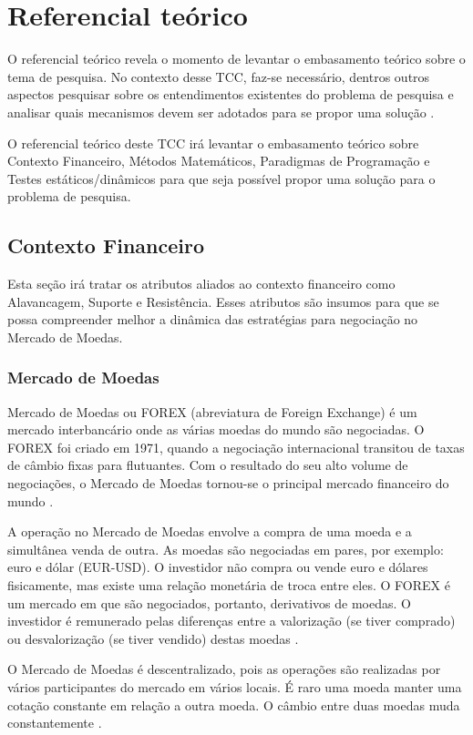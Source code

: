 \chapter{Referencial teórico}

O referencial teórico revela o momento de levantar o embasamento teórico sobre o tema de pesquisa. No contexto desse TCC, faz-se necessário, dentros outros aspectos pesquisar sobre os entendimentos existentes do problema de pesquisa e analisar quais mecanismos devem ser adotados para se propor uma solução \cite{belchior2012}.

O referencial teórico deste TCC irá levantar o embasamento teórico sobre Contexto Financeiro, Métodos Matemáticos, Paradigmas de Programação e Testes estáticos/dinâmicos para que seja possível propor uma solução para o problema de pesquisa.

\section{Contexto Financeiro}
Esta seção irá tratar os atributos aliados ao contexto financeiro como Alavancagem, Suporte e Resistência. Esses atributos são insumos para que se possa compreender melhor a dinâmica das estratégias para negociação no Mercado de Moedas.

\subsection{Mercado de Moedas}
Mercado de Moedas ou FOREX (abreviatura de Foreign Exchange) é um mercado interbancário onde as várias moedas do mundo são negociadas. O FOREX foi criado em 1971, quando a negociação internacional transitou de taxas de câmbio fixas para flutuantes. Com o resultado do seu alto volume de negociações, o Mercado de Moedas tornou-se o principal mercado financeiro do mundo \cite{market2011}.

A operação no Mercado de Moedas envolve a compra de uma moeda e a simultânea venda de outra. As moedas são negociadas em pares, por exemplo: euro e dólar (EUR-USD). O investidor não compra ou vende euro e dólares fisicamente, mas existe uma relação monetária de troca entre eles. O FOREX é um mercado em que são negociados, portanto, derivativos de moedas. O investidor é remunerado pelas diferenças entre a valorização (se tiver comprado) ou desvalorização (se tiver vendido) destas moedas \cite[pág.~3]{cvm2009}.

O Mercado de Moedas é descentralizado, pois as operações são realizadas por vários participantes do mercado em vários locais. É raro uma moeda manter uma cotação constante em relação a outra moeda. O câmbio entre duas moedas muda constantemente \cite[pág.~5]{fxcm2011}.

